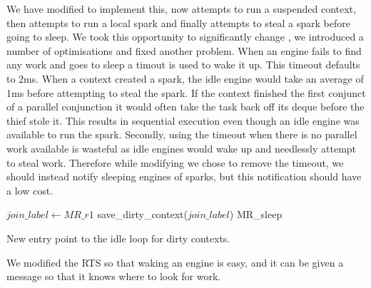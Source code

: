We have modified \getglobalwork to implement this,
now \getglobalwork attempts to run a suspended context,
then attempts to run a local spark and finally attempts to steal a spark
before going to sleep.
We took this opportunity to significantly change \getglobalwork,
we introduced a number of optimisations and fixed another problem.
When an engine fails to find any work and goes to sleep a timout is used to
wake it up.
This timeout defaults to 2ms.
When a context created a spark,
the idle engine would take an average of 1ms before attempting to steal the
spark.
If the context finished the first conjunct of a parallel conjunction it
would often take the task back off its deque before the thief stole it.
This results in sequential execution even though an idle engine was
available to run the spark.
Secondly,
using the timeout when there is no parallel work available is wasteful
as idle engines would wake up and needlessly attempt to steal work.
Therefore while modifying \getglobalwork we chose to remove the timeout,
we should instead notify sleeping engines of sparks, but this notification
should have a low cost.




\begin{algorithm}
\parbox{\textwidth}{
\begin{algorithmic}
        \State $join\_label \gets MR\_r1$
        \State {}
        \State {}
        \State save\_dirty\_context($join\_label$)
        \State {}
        \Goto MR\_sleep
    \EndProcedure
\end{algorithmic}
}
\caption{New entry point to the idle loop for dirty contexts.}
\end{algorithm}



We modified the RTS so that waking an engine is easy, and it can be given a
message so that it knows where to look for work.


